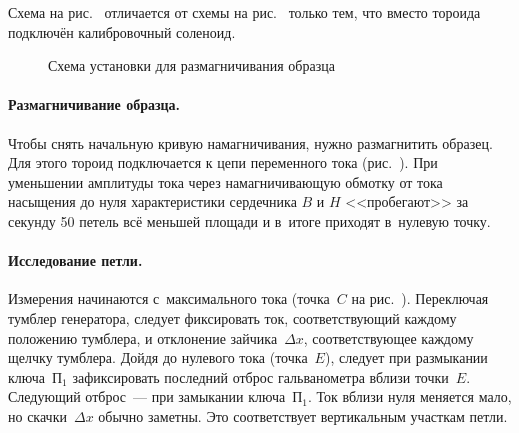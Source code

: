 



Схема на рис.~ отличается от схемы на
рис.~ только тем, что вместо тороида
подключён калибровочный соленоид.

\begin{wrapfigure}[8]{r}{0.45\textwidth}
	\caption{Схема установки для размагничивания образца}
\end{wrapfigure}

%

\paragraph{Размагничивание образца.}
Чтобы снять начальную кривую намагничивания, нужно размагнитить образец.
Для этого тороид подключается к цепи
переменного тока (рис.~). При уменьшении
амплитуды тока через намагничивающую обмотку от тока насыщения до нуля
характеристики сердечника $B$ и $H$ <<пробегают>> за секунду 50 петель всё
меньшей площади и в~итоге приходят в~нулевую
точку.

\paragraph{Исследование петли.}
Измерения начинаются с~максимального тока (точка~$C$ на рис.~). Переключая тумблер генератора,
следует фиксировать ток, соответствующий каждому положению тумблера, и
отклонение зайчика~$\Delta x$, соответствующее
каждому щелчку тумблера. Дойдя до нулевого тока
(точка~$E$), следует при размыкании ключа~$\text{П}_1$ зафиксировать последний
отброс гальванометра вблизи точки~$E$. Следующий
отброс~--- при замыкании ключа~$\text{П}_1$. Ток вблизи нуля меняется мало, но
скачки~$\Delta x$ обычно заметны. Это соответствует
вертикальным участкам петли.

